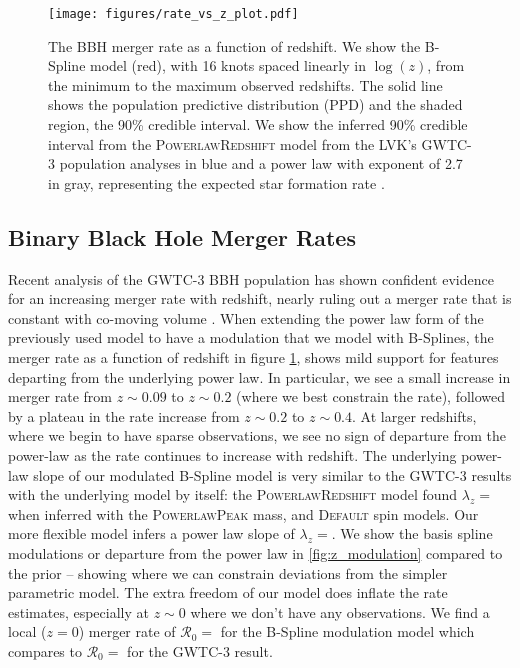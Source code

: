 \begin{figure}[h]
    \texttt{[image: figures/rate\_vs\_z\_plot.pdf]}
    \caption{The BBH merger rate as a function of redshift. We show the B-Spline model (red), with 16 knots spaced linearly in $\log(z)$, 
    from the minimum to the maximum observed redshifts. The solid line shows the population predictive distribution (PPD) and the shaded region, 
    the 90\% credible interval. We show the inferred 90\% credible interval from the \textsc{PowerlawRedshift} model 
    from the LVK's GWTC-3 population analyses in blue and a power law with exponent of 2.7 in gray, representing the expected star formation rate 
    \citep{Madau_2014, o3b_astro_dist}.}
    \label{fig:rofz}
\end{figure}

\subsection{Binary Black Hole Merger Rates}

Recent analysis of the GWTC-3 BBH population has shown confident evidence for an increasing merger rate with redshift, nearly ruling out a merger rate that is 
constant with co-moving volume \citep{Fishbach_2018redshift,o3b_astro_dist}. When extending the power law form of the previously used model to have a modulation 
that we model with B-Splines, the merger rate as a function of redshift in figure \ref{fig:rofz}, shows mild support for features departing from the underlying power law. 
In particular, we see a small increase in merger rate from $z\sim0.09$ to $z\sim0.2$ (where we best constrain the rate), followed by a plateau in the rate increase from $z\sim0.2$ to $z\sim0.4$. 
At larger redshifts, where we begin to have sparse observations, we see no sign of departure from the power-law as the rate continues to increase with redshift. 
The underlying power-law slope of our modulated B-Spline model is very similar to the GWTC-3 results with the underlying model by itself: the \textsc{PowerlawRedshift} model 
found $\lambda_z = $\result{$\CIPlusMinus{\macros[PLPeak][lamb]}$} when inferred with the \textsc{PowerlawPeak} mass, and \textsc{Default} spin models. Our more 
flexible model infers a power law slope of $\lambda_z = $\result{$\CIPlusMinus{\macros[BSplineIIDCompSpins][lamb]}$}. We show the basis spline modulations or departure 
from the power law in \ref{fig:z_modulation} compared to the prior -- showing where we can constrain deviations from the simpler parametric model. 
The extra freedom of our model does inflate the rate estimates, especially at $z\sim0$ where we don't have any observations. We find a local ($z=0$) merger rate 
of $\mathcal{R}_0 = $ for the B-Spline modulation model which compares to 
$\mathcal{R}_0 = $ for the GWTC-3 result. 

